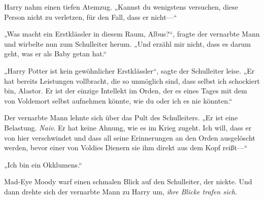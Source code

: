 Harry nahm einen tiefen Atemzug. „Kannst du wenigstens versuchen, diese Person nicht zu verletzen, für den Fall, dass er nicht—“

„Was macht ein Erstklässler in diesem Raum, Albus?“, fragte der vernarbte Mann und wirbelte nun zum Schulleiter herum. „Und erzähl mir nicht, dass es darum geht, was er als Baby getan hat.“

„Harry Potter ist kein gewöhnlicher Erstklässler“, sagte der Schulleiter leise. „Er hat bereits Leistungen vollbracht, die so unmöglich sind, dass selbst ich schockiert bin, Alastor. Er ist der einzige Intellekt im Orden, der es eines Tages mit dem von Voldemort selbst aufnehmen könnte, wie du oder ich es nie könnten.“

Der vernarbte Mann lehnte sich über das Pult des Schulleiters. „Er ist eine Belastung. \emph{Naiv}. Er hat keine Ahnung, wie es im Krieg zugeht. Ich will, dass er von hier verschwindet und dass all seine Erinnerungen an den Orden ausgelöscht werden, bevor einer von Voldies Dienern sie ihm direkt aus dem Kopf reißt—“

„Ich bin ein Okklumens.“


Mad-Eye Moody warf einen schmalen Blick auf den Schulleiter, der nickte. Und dann drehte sich der vernarbte Mann zu Harry um, \emph{ihre Blicke trafen sich.}

